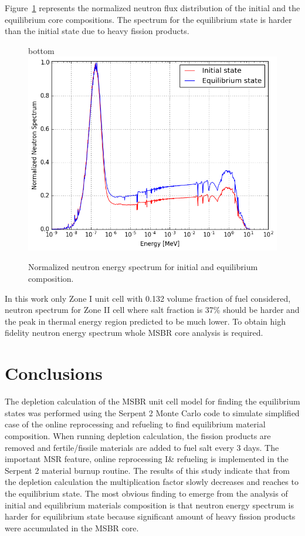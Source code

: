 \documentclass{anstrans}
\begin{document}
Figure~\ref{fig:spectrum} represents the normalized neutron flux distribution 
of the initial and the equilibrium core compositions. The spectrum for the 
equilibrium state is harder than the initial state due to heavy fission 
products.  \begin{figure}[hb] %
        bottom
        \centering
        \vspace{-0.85em}
        \includegraphics[width=1.04\linewidth]{spectrum.png}
        \vspace{-0.6em}
        \caption{Normalized neutron energy spectrum for initial and equilibrium 
        composition.}
        \label{fig:spectrum}
        \vspace{-0.10em}
\end{figure}

In this work only Zone I unit cell with 0.132 volume fraction of fuel 
considered, neutron spectrum for Zone II cell where salt fraction is 37\% 
should be harder and the peak in thermal energy region predicted to be much 
lower. To obtain high fidelity neutron energy spectrum whole \gls{MSBR} core 
analysis is required.
\section{Conclusions}
The depletion calculation of the \gls{MSBR} unit cell model for finding the 
equilibrium states was performed using the Serpent 2 Monte Carlo code to 
simulate simplified case of the online reprocessing and refueling to find 
equilibrium material composition. When running depletion calculation, the 
fission products are removed and fertile/fissile materials are added to fuel 
salt every 3 days. The important MSR feature, online reprocessing I\& refueling 
is implemented in the Serpent 2 material burnup routine. The results of this 
study indicate that from the depletion calculation the multiplication factor 
slowly decreases and reaches to the equilibrium state. The most obvious finding 
to emerge from the analysis of initial and equilibrium materials composition is 
that neutron energy spectrum is harder for equilibrium state because 
significant amount of heavy fission products were accumulated in the \gls{MSBR} 
core.
\end{document}
